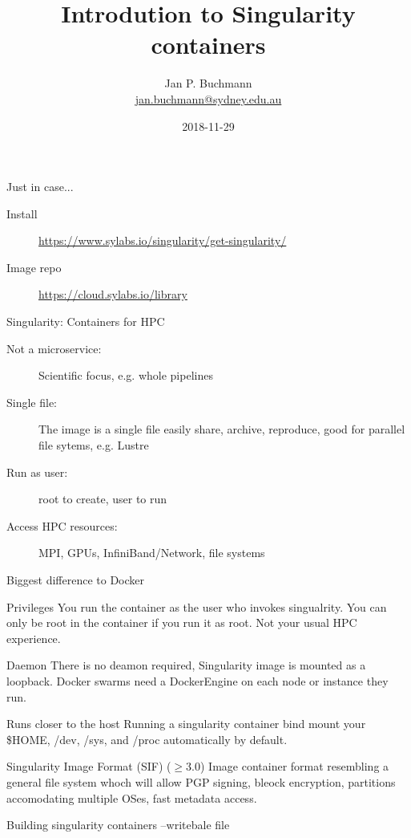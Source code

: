 \documentclass{beamer}
\title[]{Introdution to Singularity containers}
\subtitle{}
\author[]{Jan P. Buchmann\\\small{\href{mailto:jan.buchmann@sydney.edu.au}{jan.buchmann@sydney.edu.au}}}
\institute{The University Of Sydney}
\date{2018-11-29}
\begin{document}
  \titlepage

  \begin{frame}{Just in case...}
    \begin{description}
      \item[Install] \url{https://www.sylabs.io/singularity/get-singularity/}
      \item[Image repo] \url{https://cloud.sylabs.io/library}
    \end{description}
  \end{frame}

  \begin{frame}{Singularity: Containers for HPC}
    \begin{description}
      \item[Not a microservice:]Scientific focus, e.g. whole pipelines
      \item[Single file:] The image is a single file easily share, archive,
                          reproduce, good for parallel file sytems, e.g. Lustre
      \item[Run as user:] root to create, user to run
      \item[Access HPC resources:] MPI, GPUs, InfiniBand/Network, file systems
    \end{description}
  \end{frame}


  \begin{frame}{Biggest difference to Docker}
    \begin{block}{Privileges}
      You run the container as the user who invokes singualrity. You can only
      be root in the container if you run it as root. Not your usual HPC
      experience.
    \end{block}
    \begin{block}{Daemon}
      There is no deamon required, Singularity image is mounted as a loopback.
      Docker swarms need a DockerEngine on each  node or instance they run.
    \end{block}
    \begin{block}{Runs closer to the host}
      Running a singularity container bind mount your \$HOME, /dev, /sys, and
      /proc automatically by default.
    \end{block}
    \begin{block}{Singularity Image Format (SIF) ($\geq$3.0)}
      Image container format resembling a general file system whoch will allow
      PGP signing, bleock encryption, partitions accomodating multiple OSes,
      fast metadata access.
    \end{block}
  \end{frame}

  \begin{frame}{Building singularity containers}
    --writebale
    file
  \end{frame}
\end{document}
